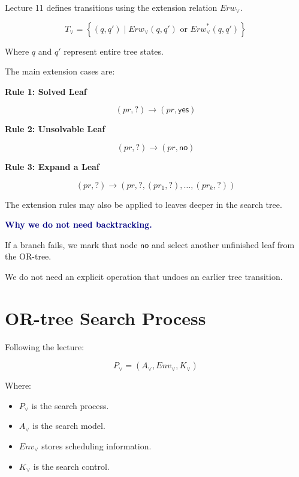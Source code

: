 \documentclass[11pt,letterpaper]{article}
\newcommand{\yes}{\mathsf{yes}}
\newcommand{\no}{\mathsf{no}}
\newcommand{\ask}{\mathord{?}}
\newcommand{\Erw}{\mathit{Erw}}
\newcommand{\Env}{\mathit{Env}}
\newcommand{\key}[1]{
    \textcolor{navy}{\bfseries #1}
}
\begin{document}
Lecture 11 defines transitions using
the extension relation $\Erw_{\lor}$.

\begin{equation}
\boxed{
T_{\lor}=
\left\{
(q,q')\mid
\Erw_{\lor}(q,q')
\text{ or }
\Erw_{\lor}^{*}(q,q')
\right\}
}
\end{equation}

Where $q$ and $q'$ represent entire tree states.

The main extension cases are:

\textbf{Rule 1: Solved Leaf}

\begin{equation}
(pr,\ask)
\longrightarrow
(pr,\yes)
\end{equation}

\textbf{Rule 2: Unsolvable Leaf}

\begin{equation}
(pr,\ask)
\longrightarrow
(pr,\no)
\end{equation}

\textbf{Rule 3: Expand a Leaf}

\begin{equation}
\boxed{
(pr,\ask)
\longrightarrow
(pr,\ask,
(pr_1,\ask),\ldots,(pr_k,\ask))
}
\end{equation}

The extension rules may also be applied
to leaves deeper in the search tree.

\begin{idea}
\key{Why we do not need backtracking.}

If a branch fails, we mark that node
$\no$ and select another unfinished
leaf from the OR-tree.

We do not need an explicit operation
that undoes an earlier tree transition.
\end{idea}

\section{OR-tree Search Process}

Following the lecture:

\begin{equation}
\boxed{
P_{\lor}=
(A_{\lor},\Env_{\lor},K_{\lor})
}
\end{equation}

Where:

\begin{itemize}
    \item $P_{\lor}$ is the search process.
    \item $A_{\lor}$ is the search model.
    \item $\Env_{\lor}$ stores scheduling information.
    \item $K_{\lor}$ is the search control.
\end{itemize}
\end{document}
